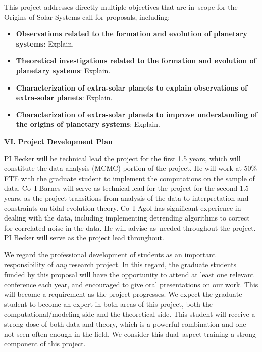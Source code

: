 This project addresses directly multiple objectives that are in--scope
for the Origins of Solar Systems call for proposals, including:
\begin{itemize}

\item {\bf Observations related to the formation and evolution of
  planetary systems}: Explain.

\item {\bf Theoretical investigations related to the formation and
  evolution of planetary systems}: Explain.

\item {\bf Characterization of extra-solar planets to explain
  observations of extra-solar planets}: Explain.

\item {\bf Characterization of extra-solar planets to improve
  understanding of the origins of planetary systems}: Explain.

\end{itemize}



\bigskip
\centerline{\bf VI. Project Development Plan}
\smallskip

PI Becker will be technical lead the project for the first 1.5 years,
which will constitute the data analysis (MCMC) portion of the project.
He will work at 50\% FTE with the graduate student to implement the
computations on the \kepler sample of data.  Co--I Barnes will serve as
technical lead for the project for the second 1.5 years, as the
project transitions from analysis of the data to interpretation and
constraints on tidal evolution theory.  Co--I Agol has significant
experience in dealing with the \kepler data, including implementing
detrending algorithms to correct for correlated noise in the \kepler
data.  He will advise as--needed throughout the project.  PI Becker
will serve as the project lead throughout.

We regard the professional development of students as an important
responsibility of {\it any} research project.  In this regard, the
graduate students funded by this proposal will have the opportunity to
attend at least one relevant conference each year, and encouraged to
give oral presentations on our work.  This will become a requirement
as the project progresses.  We expect the graduate student to become
an expert in both areas of this project, both the
computational/modeling side and the theoretical side.  This student
will receive a strong dose of both data and theory, which is a
powerful combination and one not seen often enough in the field.  We
consider this dual--aspect training a strong component of this
project.

